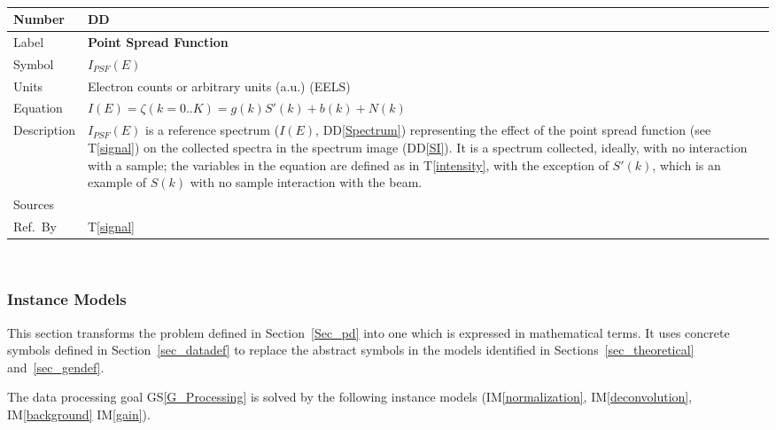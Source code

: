 \documentclass[12pt]{article}
\newcommand{\colAwidth}{0.13\textwidth}
\newcommand{\colBwidth}{0.82\textwidth}
\newcounter{defnum} %
\newcounter{datadefnum} %
\newcommand{\ddref}[1]{DD\ref{#1}}
\newcommand{\tref}[1]{T\ref{#1}}
\newcommand{\gsref}[1]{GS\ref{#1}}
\newcommand{\iref}[1]{IM\ref{#1}}
\begin{document}
~\newline

\noindent
\begin{minipage}{\textwidth}
	\renewcommand*{\arraystretch}{1.5}
	\begin{tabular}{| p{\colAwidth} | p{\colBwidth}|}
		\hline
		\rowcolor[gray]{0.9}
		Number& DD{datadefnum}\thedatadefnum \label{PSF}\\
		\hline
		Label& \bf Point Spread Function\\
		\hline
		Symbol &$I_{PSF}(E)$\\
		\hline
		Units & Electron counts or arbitrary units (a.u.) (EELS)\\
		  \hline
		  Equation&$I(E) = \zeta(k={0..K}) = g(k) S'(k) + b(k) + N(k)$\\
		  \hline
		  Description & 
		               $I_{PSF}(E)$ is a reference spectrum ($I(E)$, \ddref{Spectrum}) representing the effect of the point spread function (see \tref{signal}) on the collected spectra in the spectrum image (\ddref{SI}). It is a spectrum collected, ideally, with no interaction with a sample; the variables in the equation are defined as in \tref{intensity}, with the exception of $S'(k)$, which is an example of $S(k)$ with no sample interaction with the beam.
		  \\
		  \hline
		  Sources&~\cite{zuo_electron_2000, jeanguillaume_spectrum-image:_1989, gloter_improving_2003}  \\
		  \hline
		  Ref.\ By & \tref{signal}\\
		  \hline
	\end{tabular}
\end{minipage}\\

\subsubsection{Instance Models} \label{sec_instance}    

This section transforms the problem defined in Section~\ref{Sec_pd} into 
one which is expressed in mathematical terms. It uses concrete symbols defined 
in Section~\ref{sec_datadef} to replace the abstract symbols in the models 
identified in Sections~\ref{sec_theoretical} and~\ref{sec_gendef}.

The data processing goal \gsref{G_Processing} is solved by the following instance models (\iref{normalization}, \iref{deconvolution}, \iref{background} \iref{gain}).

~\newline
\end{document}
